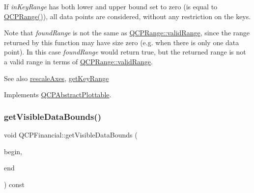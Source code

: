 If {\itshape in\+Key\+Range} has both lower and upper bound set to zero (is equal to {\ttfamily \hyperlink{class_q_c_p_range}{Q\+C\+P\+Range()}}), all data points are considered, without any restriction on the keys.

Note that {\itshape found\+Range} is not the same as \hyperlink{class_q_c_p_range_ab38bd4841c77c7bb86c9eea0f142dcc0}{Q\+C\+P\+Range\+::valid\+Range}, since the range returned by this function may have size zero (e.\+g. when there is only one data point). In this case {\itshape found\+Range} would return true, but the returned range is not a valid range in terms of \hyperlink{class_q_c_p_range_ab38bd4841c77c7bb86c9eea0f142dcc0}{Q\+C\+P\+Range\+::valid\+Range}.

\begin{DoxySeeAlso}{See also}
\hyperlink{class_q_c_p_abstract_plottable_a1491c4a606bccd2d09e65e11b79eb882}{rescale\+Axes}, \hyperlink{class_q_c_p_financial_a15d68fb257113fef697356d65fa76559}{get\+Key\+Range} 
\end{DoxySeeAlso}


Implements \hyperlink{class_q_c_p_abstract_plottable_a4de773988b21ed090fddd27c6a3a3dcb}{Q\+C\+P\+Abstract\+Plottable}.

\mbox{\label{class_q_c_p_financial_a31a3dda8b6b9a5b674e28f1daeb21a75}} 
\subsubsection{\texorpdfstring{get\+Visible\+Data\+Bounds()}{getVisibleDataBounds()}}
{\footnotesize\ttfamily void Q\+C\+P\+Financial\+::get\+Visible\+Data\+Bounds (\begin{DoxyParamCaption}\item[{\hyperlink{class_q_c_p_data_container_ae40a91f5cb0bcac61d727427449b7d15}{Q\+C\+P\+Financial\+Data\+Container\+::const\+\_\+iterator} \&}]{begin,  }\item[{\hyperlink{class_q_c_p_data_container_ae40a91f5cb0bcac61d727427449b7d15}{Q\+C\+P\+Financial\+Data\+Container\+::const\+\_\+iterator} \&}]{end }\end{DoxyParamCaption}) const\hspace{0.3cm}{\ttfamily [protected]}}

\mbox{\label{class_q_c_p_financial_a2bf2228cc443eb5fb11ec3ea3902859c}} 
